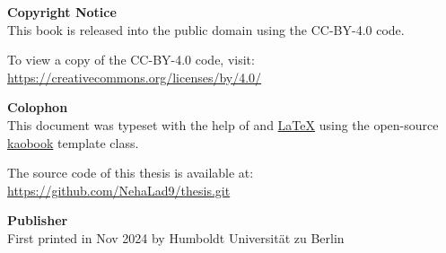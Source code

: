 \newpage
\thispagestyle{plain}

\begin{flushleft}	
	\vspace*{8cm}
	
	\textbf{Copyright Notice} \\
	This book is released into the public domain using the CC-BY-4.0 code.

	To view a copy of the CC-BY-4.0 code, visit: \\\url{https://creativecommons.org/licenses/by/4.0/}

	\medskip
	
	\textbf{Colophon} \\
	This document was typeset with the help of \href{https://sourceforge.net/projects/koma-script/}{\KOMAScript} and \href{https://www.latex-project.org/}{\LaTeX} using the open-source \href{https://github.com/fmarotta/kaobook/}{kaobook} template class. \\
	
	\medskip
	
	The source code of this thesis is available  at: \\\url{https://github.com/NehaLad9/thesis.git}

	\medskip

	\textbf{Publisher} \\
	First printed in Nov 2024 by Humboldt Universität zu Berlin
\end{flushleft}
	




